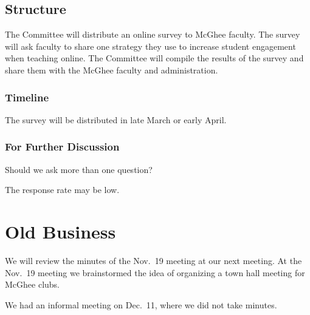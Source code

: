 \documentclass[10pt]{meetingmins}
\begin{document}
\subsection{Structure}
The Committee will distribute an online survey to McGhee faculty. The survey will ask faculty to share one strategy they use to increase student engagement when teaching online. The Committee will compile the results of the survey and share them with the McGhee faculty and administration.
\subsubsection{Timeline} The survey will be distributed in late March or early  April.
\subsubsection{For Further Discussion} \begin{subitems}
	\item Should we ask more than one question? 
\item The response rate may be low. 
\end{subitems}
\section{Old Business}
\begin{items}
	\item We will review the minutes of the Nov.~19 meeting at our next meeting. At the Nov.~19 meeting we brainstormed the idea of  organizing a town hall meeting for McGhee clubs.  
	\item We had an informal meeting on Dec.~11, where we did not take minutes. 
\end{items}
\vspace{1em}
\end{document}
